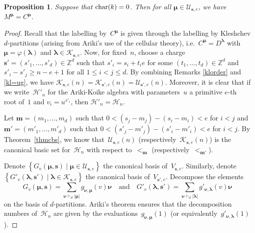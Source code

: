 \documentclass[twoside,12pt]{amsart}
\theoremstyle{plain}
\newtheorem{prp}[num]{Proposition}
\begin{document}
\begin{prp}\label{propcbs}
Suppose that ${\text{\rm char}}(k)=0$. Then
for all ${\boldsymbol{\mu}}\in{\mathcal{U}}_{{\mathbf{s}},e}$, we have $M^{\boldsymbol{\mu}}=C^{\boldsymbol{\mu}}$.
\end{prp}
\begin{proof}
Recall that the labelling by~$C^{\boldsymbol{\mu}}$ is given through the labelling by 
Kleshchev $d$-partitions (arising from Ariki's use of the cellular theory), 
i.e.\ $C^{\boldsymbol{\mu}}=D^{\boldsymbol{\lambda}}$ with ${\boldsymbol{\mu}}=\varphi({\boldsymbol{\lambda}})$ and ${\boldsymbol{\lambda}}\in{\mathcal{K}}_{{\mathbf{s}},e}$.
Now, for fixed~$n$, choose a charge ${\mathbf{s}}'=(s'_1,\dots,s'_d)\in{\mathbb{Z}}^d$ such that 
$s'_i=s_i+t_ie$ for some $(t_1,\dots,t_d)\in{\mathbb{Z}}^d$ and $s'_i-s'_j \geq n-e+1$ 
for all $1\leq i<j \leq d$. By combining Remarks \ref{klorder} and \ref{kl=ug}, 
we have ${\mathcal{K}}_{{\mathbf{s}},e}(n)={\mathcal{K}}_{{\mathbf{s}}',e}(n)={\mathcal{U}}_{{\mathbf{s}}',e}(n)$. Moreover, it is clear that if we 
write~${\mathcal{H}}'_n$ for the Ariki-Koike algebra with parameters~$u$ a primitive 
$e$-th root of~$1$ and $v_i=u^{s'_i}$, then ${\mathcal{H}}'_n={\mathcal{H}}_n$.

Let ${\mathbf{m}}=(m_1,\dots,m_d)$ such that $0< (s_j-m_j)-(s_i-m_i)<e$ for $i<j$ and
${\mathbf{m}}'=(m'_1,\dots,m'_d)$ such that $0< (s'_j-m'_j)-(s'_i-m'_i)<e$ for $i<j$.
By Theorem~\ref{thmcbs}, we know that~${\mathcal{U}}_{{\mathbf{s}},e}(n)$ 
(respectively~${\mathcal{K}}_{{\mathbf{s}},e}(n)$) is the canonical basic set for~${\mathcal{H}}_n$ with 
respect to~$<_{\mathbf{m}}$ (respectively~$<_{{\mathbf{m}}'}$).

Denote $\left\{ G_v({\boldsymbol{\mu}},{\mathbf{s}}) \mid {\boldsymbol{\mu}}\in{\mathcal{U}}_{{\mathbf{s}},e} \right\}$ the 
canonical basis of~$V_{{\mathbf{s}},e}$. Similarly, denote $\left\{ G'_v({\boldsymbol{\lambda}},{\mathbf{s}}') \mid
{\boldsymbol{\lambda}}\in{\mathcal{K}}_{{\mathbf{s}},e} \right\}$ the canonical basis of~$V_{{\mathbf{s}}',e}$.
Decompose the elements 
$$G_v({\boldsymbol{\mu}},{\mathbf{s}})=\sum_{{\boldsymbol{\nu}}\vdash_d |{\boldsymbol{\mu}}|} g_{{\boldsymbol{\nu}},{\boldsymbol{\mu}}}(v) {\boldsymbol{\nu}} {\quad\text{and}\quad} 
G'_v({\boldsymbol{\lambda}},{\mathbf{s}}')=\sum_{{\boldsymbol{\nu}}\vdash_d |{\boldsymbol{\lambda}}|} g'_{{\boldsymbol{\nu}},{\boldsymbol{\lambda}}}(v) {\boldsymbol{\nu}}$$
on the basis of $d$-partitions. Ariki's theorem ensures that the decomposition 
numbers of~${\mathcal{H}}_n$ are given by the evaluations~$g_{{\boldsymbol{\nu}},{\boldsymbol{\mu}}}(1)$ (or 
equivalently~$g'_{{\boldsymbol{\nu}},{\boldsymbol{\lambda}}}(1)$).


\end{proof}
\end{document}
